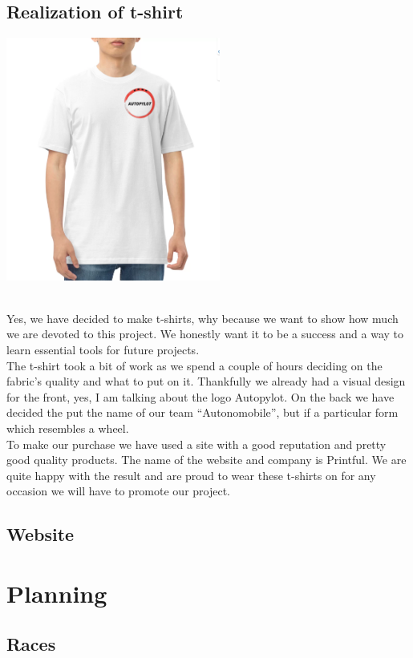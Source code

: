 \documentclass[12pt]{article}
\begin{document}
\subsection{Realization of t-shirt}
\centerline{\includegraphics[height=8cm]{../../t-shirts/white_t-shirt.png}}\\
Yes, we have decided to make t-shirts, why because we want to show how much we are devoted to this project. We honestly want it to be a success and a way to learn essential tools for future projects. \\ 

The t-shirt took a bit of work as we spend a couple of hours deciding on the fabric’s quality and what to put on it. Thankfully we already had a visual design for the front, yes, I am talking about the logo Autopylot.  On the back we have decided the put the name of our team “Autonomobile”, but if a particular form which resembles a wheel. \\ 

To make our purchase we have used a site with a good reputation and pretty good quality products. The name of the website and company is Printful.  We are quite happy with the result and are proud to wear these t-shirts on for any occasion we will have to promote our project. 

\subsection{Website}


\section {Planning}
\subsection {Races}
\end{document}
